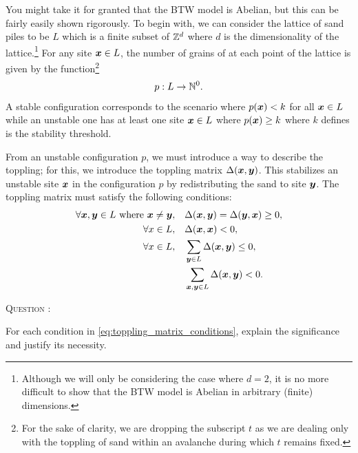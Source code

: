 \documentclass[
  a4paper,             %
  11pt,                %
  oneside,             %
  onecolumn,           %
  bibliography=totoc,  %
  final,               %
]{scrartcl}
\newcounter{question}
\newenvironment{question}{%
  \stepcounter{question}%
  \begin{tcolorbox}[
      colframe=black,
      sharp corners=all,
      boxsep=0.5ex,
    ]
    \noindent\textsc{\large Question \arabic{question}:} %
}{%
  \end{tcolorbox}%
}
\begin{document}
You might take it for granted that the \gls{BTW} model is Abelian, but this can
be fairly easily shown rigorously.  To begin with, we can consider the lattice
of sand piles to be \(L\) which is a finite subset of \(\mathbb{Z}^{d}\) where \(d\)
is the dimensionality of the lattice.\footnote{Although we will only be
  considering the case where \(d = 2\), it is no more difficult to show that the
  \gls{BTW} model is Abelian in arbitrary (finite) dimensions.}  For any site
\(\boldsymbol{x} \in L\), the number of grains of at each point of the lattice is given
by the function\footnote{For the sake of clarity, we are dropping the subscript
  \(t\) as we are dealing only with the toppling of sand within an avalanche
  during which \(t\) remains fixed.}
\begin{equation}
  p : L \to \mathbb{N}^{0}.
\end{equation}
A stable configuration corresponds to the scenario where \(p(\boldsymbol{x}) < k\) for
all \(\boldsymbol{x} \in L\) while an unstable one has at least one site \(\boldsymbol{x} \in L\)
where \(p(\boldsymbol{x}) \geq k\) where \(k\) defines is the stability threshold.

From an unstable configuration \(p\), we must introduce a way to describe the
toppling; for this, we introduce the toppling matrix \(\Delta(\boldsymbol{x}, \boldsymbol{y})\).  This stabilizes an unstable site \(\boldsymbol{x}\) in the configuration \(p\) by
redistributing the sand to site \(\boldsymbol{y}\).  The toppling matrix must satisfy the
following conditions:
\begin{subequations}
  \label{eq:toppling_matrix_conditions}
  \begin{align}
    \forall \boldsymbol{x}, \boldsymbol{y} \in L \text{ where } \boldsymbol{x} \neq \boldsymbol{y},
     & \quad \Delta(\boldsymbol{x}, \boldsymbol{y}) = \Delta(\boldsymbol{y}, \boldsymbol{x}) \geq 0, \\
    \forall x \in L,
     & \quad \Delta(\boldsymbol{x}, \boldsymbol{x}) < 0,                           \\
    \forall x \in L,
     & \quad \sum_{\boldsymbol{y} \in L} \Delta(\boldsymbol{x}, \boldsymbol{y}) \leq 0,     \\
     & \quad \sum_{\boldsymbol{x}, \boldsymbol{y} \in L} \Delta(\boldsymbol{x}, \boldsymbol{y}) < 0.
  \end{align}
\end{subequations}

\begin{question}
  For each condition in \cref{eq:toppling_matrix_conditions}, explain the
  significance and justify its necessity.
\end{question}
\end{document}
